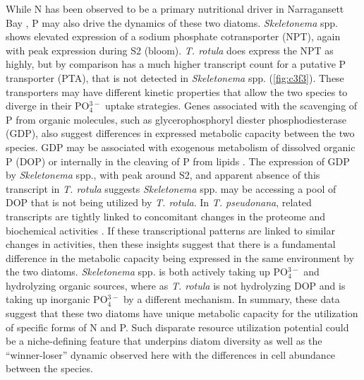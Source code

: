 While N has been observed to be a primary nutritional driver in Narragansett Bay \citep{Nixon1995,Smayda1974,Sakshaug1977}, P may also drive the dynamics of these two diatoms. \textit{Skeletonema} spp. shows elevated expression of a sodium phosphate cotransporter (NPT), again with peak expression during S2 (bloom). \textit{T. rotula} does express the NPT as highly, but by comparison has a much higher transcript count for a putative P transporter (PTA), that is not detected in \textit{Skeletonema} spp. (\cref{fig:c3f3}). These transporters may have different kinetic properties that allow the two species to diverge in their PO$_4^{3-}$ uptake strategies.  Genes associated with the scavenging of P from organic molecules, such as glycerophosphoryl diester phosphodiesterase (GDP), also suggest differences in expressed metabolic capacity between the two species. GDP may be associated with exogenous metabolism of dissolved organic P (DOP) or internally in the cleaving of P from lipids \citep{VanMooy2009, Dyhrman2012}. The expression of GDP by \textit{Skeletonema} spp., with peak around S2, and apparent absence of this transcript in \textit{T. rotula} suggests \textit{Skeletonema} spp. may be accessing a pool of DOP that is not being utilized by \textit{T. rotula}. In \textit{T. pseudonana}, related transcripts are tightly linked to concomitant changes in the proteome and biochemical activities \citep{Dyhrman2012}.  If these transcriptional patterns are linked to similar changes in activities, then these insights suggest that there is a fundamental difference in the metabolic capacity being expressed in the same environment by the two diatoms.  \textit{Skeletonema} spp. is both actively taking up PO$_4^{3-}$ and hydrolyzing organic sources, where as \textit{T. rotula} is not hydrolyzing DOP and is taking up inorganic PO$_4^{3-}$ by a different mechanism.  In summary, these data suggest that these two diatoms have unique metabolic capacity for the utilization of specific forms of N and P. Such disparate resource utilization potential could be a niche-defining feature that underpins diatom diversity as well as the ``winner-loser'' dynamic observed here with the differences in cell abundance between the species.\par
